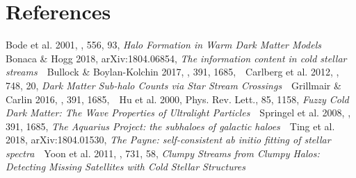 \documentclass[12pt]{article}
\begin{document}
\section*{References}\vskip-0.2in
{\small

Bode et al. 2001, \apj, 556, 93, \emph{Halo Formation in Warm Dark Matter Models} \,\textbullet\,
Bonaca \& Hogg 2018, arXiv:1804.06854, \emph{The information content in cold stellar streams} \,\textbullet\,
Bullock \& Boylan-Kolchin 2017, \araa, 391, 1685, \emph{} \,\textbullet\,
Carlberg et al. 2012, \apj, 748, 20, \emph{Dark Matter Sub-halo Counts via Star Stream Crossings} \,\textbullet\,
Grillmair \& Carlin 2016, \mnras, 391, 1685, \emph{} \,\textbullet\,
Hu et al. 2000, Phys. Rev. Lett., 85, 1158, \emph{Fuzzy Cold Dark Matter: The Wave Properties of Ultralight Particles} \,\textbullet\,
Springel et al. 2008, \mnras, 391, 1685, \emph{The Aquarius Project: the subhaloes of galactic haloes} \,\textbullet\,
Ting et al. 2018, arXiv:1804.01530, \emph{The Payne: self-consistent ab initio fitting of stellar spectra} \,\textbullet\,
Yoon et al. 2011, \apj, 731, 58, \emph{Clumpy Streams from Clumpy Halos: Detecting Missing Satellites with Cold Stellar Structures}
}
\end{document}
